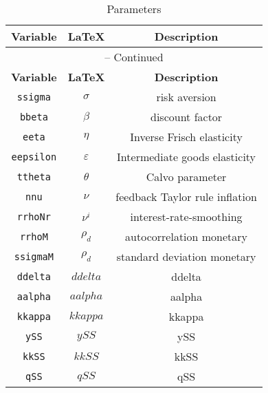 \begin{center}
\begin{longtable}{ccc}
\caption{Parameters}\\%
\hline%
\multicolumn{1}{c}{\textbf{Variable}} &
\multicolumn{1}{c}{\textbf{\LaTeX}} &
\multicolumn{1}{c}{\textbf{Description}}\\%
\hline\hline%
\endfirsthead
\multicolumn{3}{c}{{\tablename} \thetable{} -- Continued}\\%
\hline%
\multicolumn{1}{c}{\textbf{Variable}} &
\multicolumn{1}{c}{\textbf{\LaTeX}} &
\multicolumn{1}{c}{\textbf{Description}}\\%
\hline\hline%
\endhead
\texttt{ssigma} & $\sigma$ & risk aversion\\
\texttt{bbeta} & $\beta$ & discount factor\\
\texttt{eeta} & $\eta$ & Inverse Frisch elasticity\\
\texttt{eepsilon} & $\varepsilon$ & Intermediate goods elasticity\\
\texttt{ttheta} & $\theta$ & Calvo parameter\\
\texttt{nnu} & $\nu$ & feedback Taylor rule inflation\\
\texttt{rrhoNr} & $\nu^i$ & interest-rate-smoothing\\
\texttt{rrhoM} & $\rho_d$ & autocorrelation monetary\\
\texttt{ssigmaM} & $\rho_d$ & standard deviation monetary\\
\texttt{ddelta} & $ddelta$ & ddelta\\
\texttt{aalpha} & $aalpha$ & aalpha\\
\texttt{kkappa} & $kkappa$ & kkappa\\
\texttt{ySS} & $ySS$ & ySS\\
\texttt{kkSS} & $kkSS$ & kkSS\\
\texttt{qSS} & $qSS$ & qSS\\
\hline%
\end{longtable}
\end{center}
